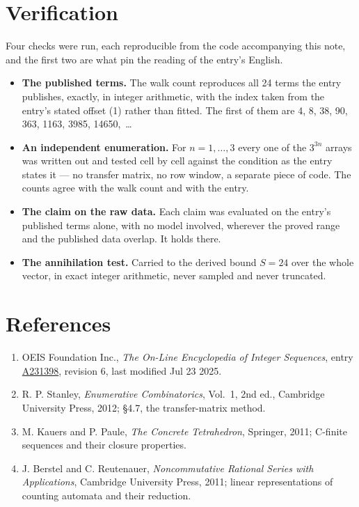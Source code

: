 \documentclass[11pt]{article}
\theoremstyle{definition}
\begin{document}
\section{Verification}

Four checks were run, each reproducible from the code accompanying this note, and the first two are what pin the reading of the entry's English.

\begin{itemize}

\item {\bfseries The published terms.} The walk count reproduces all 24 terms the entry publishes, exactly, in integer arithmetic, with the index taken from the entry's stated offset (1) rather than fitted. The first of them are 4, 8, 38, 90, 363, 1163, 3985, 14650,~\dots

\item {\bfseries An independent enumeration.} For $n = 1,\dots,3$ every one of the $3^{3n}$ arrays was written out and tested cell by cell against the condition as the entry states it --- no transfer matrix, no row window, a separate piece of code. The counts agree with the walk count and with the entry.

\item {\bfseries The claim on the raw data.} Each claim was evaluated on the entry's published terms alone, with no model involved, wherever the proved range and the published data overlap. It holds there.

\item {\bfseries The annihilation test.} Carried to the derived bound $S = 24$ over the whole vector, in exact integer arithmetic, never sampled and never truncated.

\end{itemize}

\section{References}

\begin{enumerate}

\item OEIS Foundation Inc., \emph{The On-Line Encyclopedia of Integer Sequences}, entry \href{https://oeis.org/A231398}{A231398}, revision 6, last modified Jul 23 2025.

\item R. P. Stanley, \emph{Enumerative Combinatorics}, Vol.~1, 2nd ed., Cambridge University Press, 2012; \S4.7, the transfer-matrix method.

\item M. Kauers and P. Paule, \emph{The Concrete Tetrahedron}, Springer, 2011; C-finite sequences and their closure properties.

\item J. Berstel and C. Reutenauer, \emph{Noncommutative Rational Series with Applications}, Cambridge University Press, 2011; linear representations of counting automata and their reduction.

\end{enumerate}
\end{document}
